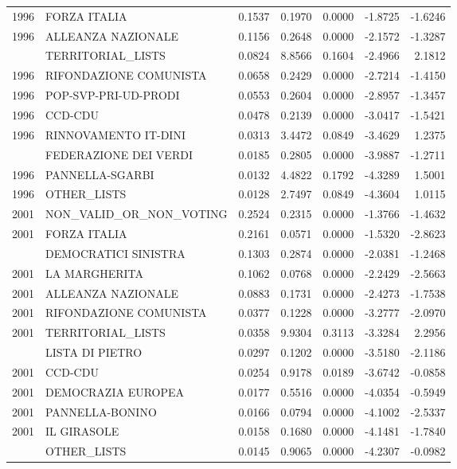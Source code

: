 \begin{longtable}[t]{rlrrrrr}
1996 & FORZA ITALIA & 0.1537 & 0.1970 & 0.0000 & -1.8725 & -1.6246\\
1996 & ALLEANZA NAZIONALE & 0.1156 & 0.2648 & 0.0000 & -2.1572 & -1.3287\\
\addlinespace
1996 & TERRITORIAL\_LISTS & 0.0824 & 8.8566 & 0.1604 & -2.4966 & 2.1812\\
1996 & RIFONDAZIONE COMUNISTA & 0.0658 & 0.2429 & 0.0000 & -2.7214 & -1.4150\\
1996 & POP-SVP-PRI-UD-PRODI & 0.0553 & 0.2604 & 0.0000 & -2.8957 & -1.3457\\
1996 & CCD-CDU & 0.0478 & 0.2139 & 0.0000 & -3.0417 & -1.5421\\
1996 & RINNOVAMENTO IT-DINI & 0.0313 & 3.4472 & 0.0849 & -3.4629 & 1.2375\\
\addlinespace
1996 & FEDERAZIONE DEI VERDI & 0.0185 & 0.2805 & 0.0000 & -3.9887 & -1.2711\\
1996 & PANNELLA-SGARBI & 0.0132 & 4.4822 & 0.1792 & -4.3289 & 1.5001\\
1996 & OTHER\_LISTS & 0.0128 & 2.7497 & 0.0849 & -4.3604 & 1.0115\\
2001 & NON\_VALID\_OR\_NON\_VOTING & 0.2524 & 0.2315 & 0.0000 & -1.3766 & -1.4632\\
2001 & FORZA ITALIA & 0.2161 & 0.0571 & 0.0000 & -1.5320 & -2.8623\\
\addlinespace
2001 & DEMOCRATICI SINISTRA & 0.1303 & 0.2874 & 0.0000 & -2.0381 & -1.2468\\
2001 & LA MARGHERITA & 0.1062 & 0.0768 & 0.0000 & -2.2429 & -2.5663\\
2001 & ALLEANZA NAZIONALE & 0.0883 & 0.1731 & 0.0000 & -2.4273 & -1.7538\\
2001 & RIFONDAZIONE COMUNISTA & 0.0377 & 0.1228 & 0.0000 & -3.2777 & -2.0970\\
2001 & TERRITORIAL\_LISTS & 0.0358 & 9.9304 & 0.3113 & -3.3284 & 2.2956\\
\addlinespace
2001 & LISTA DI PIETRO & 0.0297 & 0.1202 & 0.0000 & -3.5180 & -2.1186\\
2001 & CCD-CDU & 0.0254 & 0.9178 & 0.0189 & -3.6742 & -0.0858\\
2001 & DEMOCRAZIA EUROPEA & 0.0177 & 0.5516 & 0.0000 & -4.0354 & -0.5949\\
2001 & PANNELLA-BONINO & 0.0166 & 0.0794 & 0.0000 & -4.1002 & -2.5337\\
2001 & IL GIRASOLE & 0.0158 & 0.1680 & 0.0000 & -4.1481 & -1.7840\\
\addlinespace
2001 & OTHER\_LISTS & 0.0145 & 0.9065 & 0.0000 & -4.2307 & -0.0982\\

\end{longtable}
